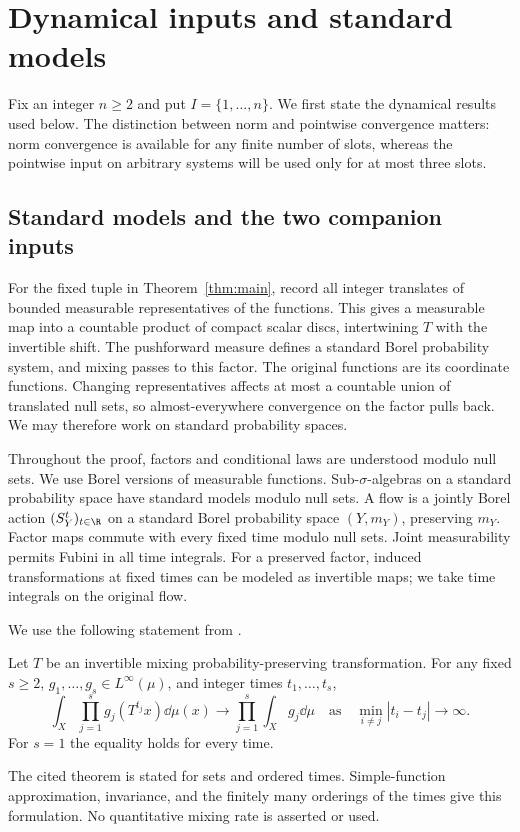 \section{Dynamical inputs and standard models}
\label{sec:inputs}

Fix an integer $n\ge2$ and put $I=\{1,\ldots,n\}$. We first state
the dynamical results used below. The distinction between norm and
pointwise convergence matters: norm convergence is available for any
finite number of slots, whereas the pointwise input on arbitrary
systems will be used only for at most three slots.

\subsection{Standard models and the two companion inputs}

For the fixed tuple in Theorem~\ref{thm:main}, record all integer
translates of bounded measurable representatives of the functions.
This gives a measurable map into a countable product of compact scalar
discs, intertwining $T$ with the invertible shift. The pushforward
measure defines a standard Borel probability system, and mixing passes
to this factor. The original functions are its coordinate functions.
Changing representatives affects at most a countable union of translated
null sets, so almost-everywhere convergence on the factor pulls back.
We may therefore work on standard probability spaces.

Throughout the proof, factors and conditional laws are understood
modulo null sets. We use Borel versions of measurable functions.
Sub-$\sigma$-algebras on a standard probability space have standard
models modulo null sets. A flow is a jointly Borel action
$(S_Y^t)_{t\in\R}$ on a standard Borel probability space $(Y,m_Y)$,
preserving $m_Y$. Factor maps commute with every fixed time modulo
null sets. Joint measurability permits Fubini in all time integrals.
For a preserved factor, induced transformations at fixed times can be
modeled as invertible maps; we take time integrals on the original flow.

We use the following statement from
\cite[Theorem~1.1]{MixingCompanion}.
\begin{theorem}
\label{thm:multiple-mixing}
Let $T$ be an invertible mixing probability-preserving transformation.
For any fixed $s\ge2$, $g_1,\ldots,g_s\in L^\infty(\mu)$,
and integer times $t_1,\ldots,t_s$,
\[
 \int_X\prod_{j=1}^s g_j(T^{t_j}x)\dd\mu(x)
 \longrightarrow\prod_{j=1}^s\int_Xg_j\dd\mu
 \quad\text{as}\quad
 \min_{i\ne j}|t_i-t_j|\longrightarrow\infty.
\]
For $s=1$ the equality holds for every time.
\end{theorem}
The cited theorem is stated for sets and ordered times. Simple-function
approximation, invariance, and the finitely many orderings of the times
give this formulation. No quantitative mixing rate is asserted or used.

